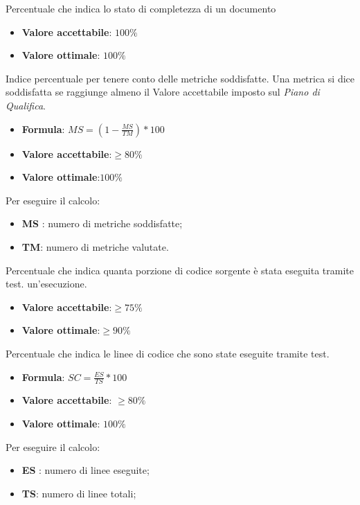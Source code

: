 Percentuale che indica lo stato di completezza di un documento
\begin{itemize}
    \item \textbf{Valore accettabile}: $100\%$
    \item \textbf{Valore ottimale}: $100\%$
\end{itemize}  


Indice percentuale per tenere conto delle metriche soddisfatte. Una
metrica si dice soddisfatta se raggiunge almeno il Valore accettabile imposto sul \textit{Piano di Qualifica}.
\begin{itemize}
    \item \textbf{Formula}: $MS = (1 - \frac{MS}{TM})*100$
    \item \textbf{Valore accettabile}:$\geq80\%$
    \item \textbf{Valore ottimale}:$100\%$
\end{itemize}  
Per eseguire il calcolo:
\begin{itemize}
    \item \textbf{MS} : numero di metriche soddisfatte;
    \item \textbf{TM}: numero di metriche valutate.
\end{itemize}

Percentuale che indica quanta porzione di codice sorgente è stata eseguita tramite test.
un’esecuzione.
\begin{itemize}
    \item \textbf{Valore accettabile}:$\geq75\%$
    \item \textbf{Valore ottimale}:$\geq90\%$
\end{itemize} 

Percentuale che indica le linee di codice che sono state eseguite tramite test.
\begin{itemize}
    \item \textbf{Formula}: $SC = \frac{ES}{TS}*100$
    \item \textbf{Valore accettabile}: $\geq80\%$
    \item \textbf{Valore ottimale}: $100\%$
\end{itemize}  
Per eseguire il calcolo:
\begin{itemize}
    \item \textbf{ES} : numero di linee eseguite;
    \item \textbf{TS}: numero di linee totali;
\end{itemize}


